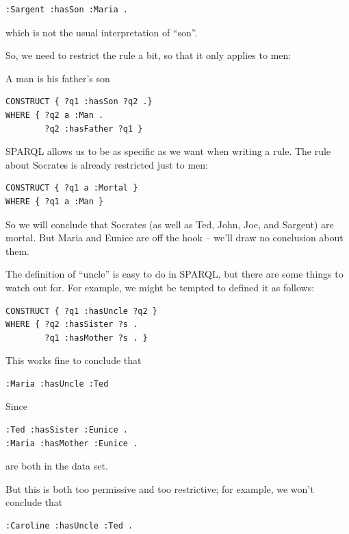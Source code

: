 \begin{lstlisting}
:Sargent :hasSon :Maria .
\end{lstlisting}

which is not the usual interpretation of ``son''.

So, we need to restrict the rule a bit, so that it only applies to men:

\begin{query}A man is his father's son\end{query}
\begin{lstlisting}
CONSTRUCT { ?q1 :hasSon ?q2 .}
WHERE { ?q2 a :Man .
        ?q2 :hasFather ?q1 }
\end{lstlisting} 


SPARQL allows us to be as specific as we want when writing a rule. The
rule about Socrates is already restricted just to men:

\begin{lstlisting}
CONSTRUCT { ?q1 a :Mortal }
WHERE { ?q1 a :Man }
\end{lstlisting}

So we will conclude that Socrates (as well as Ted, John, Joe, and
Sargent) are mortal. But Maria and 
Eunice are off the hook -- we'll draw no conclusion about them.

The definition of ``uncle'' is easy to do in SPARQL, but there are some 
things to watch out for.  For example, we might be tempted to defined it as follows: 

\begin{lstlisting}
CONSTRUCT { ?q1 :hasUncle ?q2 }
WHERE { ?q2 :hasSister ?s .
        ?q1 :hasMother ?s . }
\end{lstlisting}

This works fine to conclude that

\begin{lstlisting}
:Maria :hasUncle :Ted 
\end{lstlisting}

Since

\begin{lstlisting}
:Ted :hasSister :Eunice .
:Maria :hasMother :Eunice .
\end{lstlisting}

are both in the data set. 

But this is both too permissive and too restrictive; for example, we
won't conclude that

\begin{lstlisting}
:Caroline :hasUncle :Ted .
\end{lstlisting}

